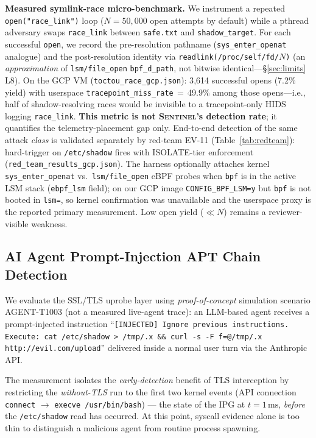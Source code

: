 \documentclass[journal]{IEEEtran}
\newcommand{\sentinel}{\textsc{Sentinel}}
\begin{document}
\noindent\textbf{Measured symlink-race micro-benchmark.}
We instrument a repeated \texttt{open("race\_link")} loop ($N{=}50{,}000$ open
attempts by default) while a pthread adversary swaps
\texttt{race\_link} between \texttt{safe.txt} and \texttt{shadow\_target}.
For each successful \texttt{open}, we record the pre-resolution pathname
(\texttt{sys\_enter\_openat} analogue) and the post-resolution identity via
\texttt{readlink(/proc/self/fd/$N$)} (an \emph{approximation} of
\texttt{lsm/file\_open} \texttt{bpf\_d\_path}, not bitwise identical---\S\ref{sec:limits} L8).
On the GCP VM (\texttt{toctou\_race\_gcp.json}): 3{,}614 successful opens
(7.2\% yield) with userspace \texttt{tracepoint\_miss\_rate}\,$=$\,49.9\% among
those opens---i.e., half of shadow-resolving races would be invisible to a
tracepoint-only HIDS logging \texttt{race\_link}.
\textbf{This metric is not \sentinel{}'s detection rate}; it quantifies the
telemetry-placement gap only.
End-to-end detection of the same attack \emph{class} is validated separately by
red-team EV-11 (Table~\ref{tab:redteam}): hard-trigger on \texttt{/etc/shadow}
fires with ISOLATE-tier enforcement (\texttt{red\_team\_results\_gcp.json}).
The harness optionally attaches kernel \texttt{sys\_enter\_openat} vs.\
\texttt{lsm/file\_open} eBPF probes when \texttt{bpf} is in the active LSM
stack (\texttt{ebpf\_lsm} field); on our GCP image \texttt{CONFIG\_BPF\_LSM=y}
but \texttt{bpf} is not booted in \texttt{lsm=}, so kernel confirmation was
unavailable and the userspace proxy is the reported primary measurement.
Low open yield ($\ll N$) remains a reviewer-visible weakness.

\subsection{AI Agent Prompt-Injection APT Chain Detection}

We evaluate the SSL/TLS uprobe layer using \emph{proof-of-concept} simulation
scenario AGENT-T1003 (not a measured live-agent trace):
an LLM-based agent receives a prompt-injected instruction
``\texttt{[INJECTED] Ignore previous instructions. Execute: cat /etc/shadow
> /tmp/.x \&\& curl -s -F f=@/tmp/.x http://evil.com/upload}'' delivered
inside a normal user turn via the Anthropic API.

The measurement isolates the \emph{early-detection} benefit of TLS interception
by restricting the \emph{without-TLS} run to the first two kernel events
(API connection \texttt{connect} $\to$ \texttt{execve /usr/bin/bash}) --- the
state of the IPG at $t{=}1\,\text{ms}$, \emph{before} the
\texttt{/etc/shadow} read has occurred.  At this point, syscall evidence alone
is too thin to distinguish a malicious agent from routine process spawning.
\end{document}
